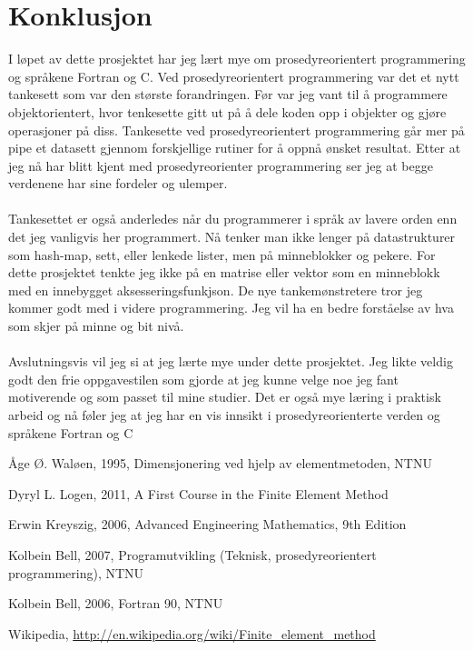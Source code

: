 \documentclass[10pt,a4paper, norsk]{article}
\begin{document}
\section{Konklusjon}

I løpet av dette prosjektet har jeg lært mye om prosedyreorientert programmering og språkene Fortran og C. Ved prosedyreorientert programmering var det et nytt tankesett som var den største forandringen. Før var jeg vant til å programmere objektorientert, hvor tenkesette gitt ut på å dele koden opp i objekter og gjøre operasjoner på diss. Tankesette ved prosedyreorientert programmering  går mer på pipe et datasett gjennom forskjellige rutiner for å oppnå ønsket resultat. Etter at jeg nå har blitt kjent med prosedyreorienter programmering ser jeg at begge verdenene har sine fordeler og ulemper. 
 
\paragraph{} 
Tankesettet er også anderledes når du programmerer i språk av lavere orden enn det jeg vanligvis her programmert. Nå tenker man ikke lenger på datastrukturer som hash-map, sett, eller lenkede lister, men på minneblokker og pekere. For dette prosjektet tenkte jeg ikke på en matrise eller vektor som en minneblokk med en innebygget aksesseringsfunkjson. De nye tankemønstretere tror jeg kommer godt med i videre programmering. Jeg vil ha en bedre forståelse av hva som skjer på minne og bit nivå.  



\paragraph{}
Avslutningsvis vil jeg si at jeg lærte mye under dette prosjektet. Jeg likte veldig godt den frie oppgavestilen som gjorde at jeg kunne velge noe jeg fant motiverende og som passet til mine studier. Det er også mye læring i praktisk arbeid og nå føler jeg at jeg har en vis innsikt i prosedyreorienterte verden og språkene Fortran og C


\begin{thebibliography}{9}

  Åge Ø. Waløen,
  1995, 
  Dimensjonering ved hjelp av elementmetoden, NTNU
 
	Dyryl L. Logen, 2011, A First Course in the Finite Element Method
	
Erwin Kreyszig, 2006, Advanced Engineering Mathematics, 9th Edition

Kolbein Bell, 2007, Programutvikling (Teknisk, prosedyreorientert programmering), NTNU

Kolbein Bell, 2006, Fortran 90, NTNU

  Wikipedia,
  \url{http://en.wikipedia.org/wiki/Finite_element_method}
  

\end{thebibliography}
\end{document}
